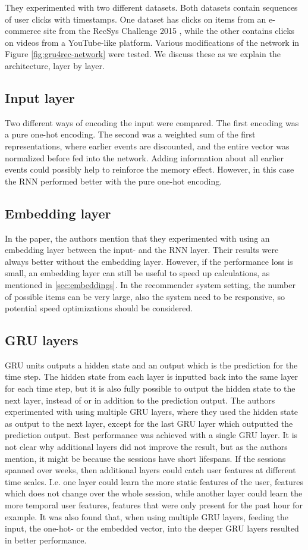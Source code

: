 They experimented with two different datasets. Both datasets contain sequences of user clicks with timestamps. One dataset has clicks on items from an e-commerce site from the RecSys Challenge 2015 \cite{dataset:recsys15}, while the other contains clicks on videos from a YouTube-like platform. Various modifications of the network in Figure \ref{fig:gru4rec-network} were tested. We discuss these as we explain the architecture, layer by layer.

\subsection{Input layer}
Two different ways of encoding the input were compared. The first encoding was a pure one-hot encoding. The second was a weighted sum of the first representations, where earlier events are discounted, and the entire vector was normalized before fed into the network. Adding information about all earlier events could possibly help to reinforce the memory effect. However, in this case the RNN performed better with the pure one-hot encoding. 

\subsection{Embedding layer}
In the paper, the authors mention that they experimented with using an embedding layer between the input- and the RNN layer. Their results were always better without the embedding layer. However, if the performance loss is small, an embedding layer can still be useful to speed up calculations, as mentioned in \ref{sec:embeddings}. In the recommender system setting, the number of possible items can be very large, also the system need to be responsive, so potential speed optimizations should be considered.

\subsection{GRU layers}
GRU units outputs a hidden state and an output which is the prediction for the time step. The hidden state from each layer is inputted back into the same layer for each time step, but it is also fully possible to output the hidden state to the next layer, instead of or in addition to the prediction output. The authors experimented with using multiple GRU layers, where they used the hidden state as output to the next layer, except for the last GRU layer which outputted the prediction output. Best performance was achieved with a single GRU layer. It is not clear why additional layers did not improve the result, but as the authors mention, it might be because the sessions have short lifespans. If the sessions spanned over weeks, then additional layers could catch user features at different time scales. I.e. one layer could learn the more static features of the user, features which does not change over the whole session, while another layer could learn the more temporal user features, features that were only present for the past hour for example. It was also found that, when using multiple GRU layers, feeding the input, the one-hot- or the embedded vector, into the deeper GRU layers resulted in better performance.


